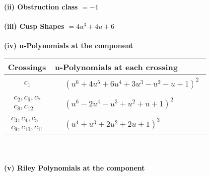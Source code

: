 \documentclass[1p]{elsarticle_modified}
\theoremstyle{definition}
\begin{document}
\flushleft \textbf{(ii) Obstruction class $= -1$}\\~\\
\flushleft \textbf{(iii) Cusp Shapes $= 4 u^3+4 u+6$}\\~\\
\newpage\renewcommand{\arraystretch}{1}
\flushleft \textbf{(iv) u-Polynomials at the component}\newline \\
\begin{tabular}{m{50pt}|m{274pt}}
Crossings & \hspace{64pt}u-Polynomials at each crossing \\
\hline $$\begin{aligned}c_{1}\end{aligned}$$&$\begin{aligned}
&(u^6+4 u^5+6 u^4+3 u^3- u^2- u+1)^2
\end{aligned}$\\
\hline $$\begin{aligned}c_{2},c_{6},c_{7}\\c_{8},c_{12}\end{aligned}$$&$\begin{aligned}
&(u^6-2 u^4- u^3+u^2+u+1)^2
\end{aligned}$\\
\hline $$\begin{aligned}c_{3},c_{4},c_{5}\\c_{9},c_{10},c_{11}\end{aligned}$$&$\begin{aligned}
&(u^4+u^3+2 u^2+2 u+1)^3
\end{aligned}$\\
\hline
\end{tabular}\\~\\
\newpage\renewcommand{\arraystretch}{1}
\flushleft \textbf{(v) Riley Polynomials at the component}\newline \\
\end{document}
